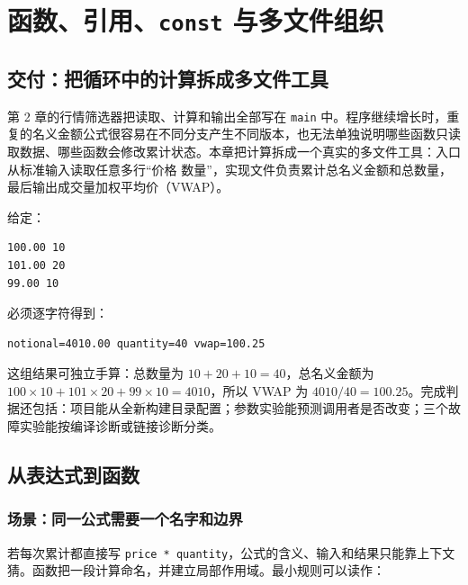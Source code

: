 \chapter{函数、引用、\texttt{const} 与多文件组织}


\section{交付：把循环中的计算拆成多文件工具}

第 2 章的行情筛选器把读取、计算和输出全部写在 \texttt{main} 中。程序继续增长时，重复的名义金额公式很容易在不同分支产生不同版本，也无法单独说明哪些函数只读取数据、哪些函数会修改累计状态。本章把计算拆成一个真实的多文件工具：入口从标准输入读取任意多行“价格 数量”，实现文件负责累计总名义金额和总数量，最后输出成交量加权平均价（VWAP）。

给定：

\begin{lstlisting}[numbers=none]
100.00 10
101.00 20
99.00 10
\end{lstlisting}

必须逐字符得到：

\begin{lstlisting}[numbers=none]
notional=4010.00 quantity=40 vwap=100.25
\end{lstlisting}

这组结果可独立手算：总数量为 $10+20+10=40$，总名义金额为 $100\times10+101\times20+99\times10=4010$，所以 VWAP 为 $4010/40=100.25$。完成判据还包括：项目能从全新构建目录配置；参数实验能预测调用者是否改变；三个故障实验能按编译诊断或链接诊断分类。

\section{从表达式到函数}

\subsection{场景：同一公式需要一个名字和边界}

若每次累计都直接写 \texttt{price * quantity}，公式的含义、输入和结果只能靠上下文猜。函数把一段计算命名，并建立局部作用域。最小规则可以读作：

